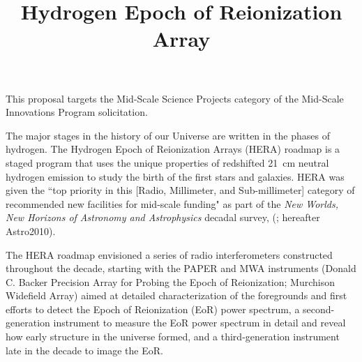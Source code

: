 \documentclass[preprint]{aastex}
\begin{document}
\title{Hydrogen Epoch of Reionization Array}



This proposal targets the Mid-Scale Science Projects category of the  Mid-Scale Innovations Program solicitation.

\vspace{0.25in}

\noindent
The major stages in the history of our Universe are written in the phases of hydrogen. The Hydrogen Epoch of Reionization Arrays (HERA) roadmap is a staged program that uses the unique properties of redshifted 21~cm neutral hydrogen emission to study the birth of the first stars and galaxies.  HERA was given the ``top priority in this [Radio, Millimeter, and Sub-millimeter] category of recommended new facilities for mid-scale funding" as part of the {\it New Worlds, New Horizons of Astronomy and Astrophysics} decadal survey, (\citealt{astro2010}; hereafter Astro2010).  

The HERA roadmap envisioned a series of radio interferometers constructed throughout the decade, starting with the PAPER and MWA instruments (Donald C. Backer Precision Array for Probing the Epoch of Reionization; Murchison Widefield Array) aimed at detailed characterization of the foregrounds and first efforts to detect the Epoch of Reionization (EoR) power spectrum, a second-generation instrument to measure the EoR power spectrum in detail and reveal how early structure in the universe formed, and a third-generation instrument late in the decade to image the EoR. 
\end{document}
